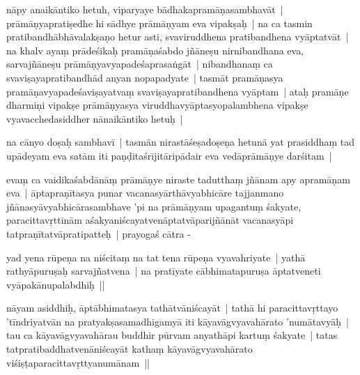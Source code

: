 \documentclass[article,12pt,a4paper]{memoir}%
\newcounter{parCount}
\begin{document}
	  \pstart \leavevmode%
	\label{thakur75-101.9}nāpy anaikāntiko hetuh, viparyaye bādhakapramāṇasambhavāt | prāmāṇyapratiṣedhe hi sādhye prāmāṇyam eva vipakṣaḥ | na ca tasmin pratibandhābhāvalakṣaṇo hetur asti, svaviruddhena pratibandhena vyāptatvāt | na khalv ayaṃ prādeśikaḥ pramāṇaśabdo jñāneṣu nirnibandhana eva, sarvajñāneṣu prāmāṇyavyapadeśaprasaṅgāt | nibandhanaṃ ca svaviṣayapratibandhād anyan nopapadyate | tasmāt pramāṇasya pramāṇavyapadeśaviṣayatvaṃ svaviṣayapratibandhena vyāptam | ataḥ pramāṇe dharmiṇi vipakṣe prāmāṇyasya viruddhavyāptasyopalambhena vipakṣe vyavacchedasiddher nānaikāntiko hetuḥ |
	{}
	\pend%
      

	  \pstart \leavevmode%
	\label{thakur75-101.16}na cānyo doṣaḥ sambhavī | tasmān nirastāśeṣadoṣeṇa hetunā yat prasiddhaṃ tad upādeyam eva satām iti paṇḍitaśrījitāripādair eva vedāprāmāṇye darśitam | 
	{}
	\pend%
      

	  \pstart \leavevmode%
	\label{thakur75-101.18}evaṃ ca vaidikaśabdānāṃ prāmāṇye niraste tadutthaṃ jñānam apy apramāṇam eva | āptapraṇītasya punar vacanasyārthāvyabhicāre tajjanmano jñānasyāvyabhicārasambhave 'pi na prāmāṇyam upagantuṃ śakyate, paracittavṛttīnām aśakyaniścayatvenāptatvāparijñānāt vacanasyāpi tatpraṇītatvāpratipatteḥ | prayogaś cātra -
	{}
	\pend%
      

	  \pstart \leavevmode%
	\label{thakur75-101.22}yad yena rūpeṇa na niścitaṃ na tat tena rūpeṇa vyavahriyate | yathā rathyāpuruṣaḥ sarvajñatvena | na pratīyate cābhimatapuruṣa āptatveneti vyāpakānupalabdhiḥ || 
	{}
	\pend%
      

	  \pstart \leavevmode%
	\label{thakur75-101.24}nāyam asiddhiḥ, āptābhimatasya tathātvāniścayāt | tathā hi paracittavṛttayo 'tīndriyatvān na pratyakṣasamadhigamyā iti kāyavāgvyavahārato 'numātavyāḥ | tau ca kāyavāgvyavahārau buddhir pūrvam anyathāpi kartuṃ śakyate | tatas tatpratibaddhatvenāniścayāt kathaṃ kāyavāgvyavahārato viśiṣṭaparacittavṛttyanumānam ||
	{}
	\pend%
      
\end{document}
